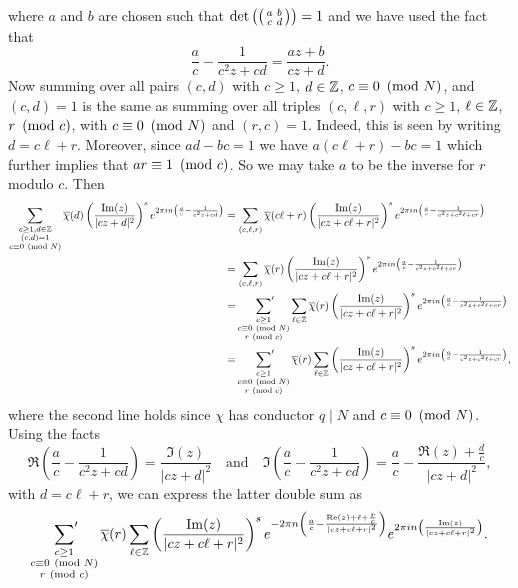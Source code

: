     where $a$ and $b$ are chosen such that $\det\left(\begin{psmallmatrix} a & b \\ c & d \end{psmallmatrix}\right) = 1$ and we have used the fact that
    \[
      \frac{a}{c}-\frac{1}{c^{2}z+cd} = \frac{az+b}{cz+d}.
    \]
    Now summing over all pairs $(c,d)$ with $c \ge 1$, $d \in \mathbb{Z}$, $c \equiv 0 \ \left(\text{mod }N\right)$, and $(c,d) = 1$ is the same as summing over all triples $(c,\ell,r)$ with $c \ge 1$, $\ell \in \mathbb{Z}$, $r \ \left(\text{mod }c\right)$, with $c \equiv 0 \ \left(\text{mod }N\right)$ and $(r,c) = 1$. Indeed, this is seen by writing $d = c\ell+r$. Moreover, since $ad-bc = 1$ we have $a(c\ell+r)-bc = 1$ which further implies that $ar \equiv 1 \ \left(\text{mod }c\right)$. So we may take $a$ to be the inverse for $r$ modulo $c$. Then
    \begin{align*}
      \sum_{\substack{c \ge 1,d \in \mathbb{Z} \\ (c,d) = 1 \\ c \equiv 0 \ \left(\text{mod }N\right)}}\overline{\chi}(d)\left(\frac{\mathrm{Im}(z)}{|cz+d|^{2}}\right)^{s}e^{2\pi in\left(\frac{a}{c}-\frac{1}{c^{2}z+cd}\right)} &= \sum_{(c,\ell,r)}\overline{\chi}(c\ell+r)\left(\frac{\mathrm{Im}(z)}{|cz+c\ell+r|^{2}}\right)^{s}e^{2\pi in\left(\frac{a}{c}-\frac{1}{c^{2}z+c^{2}\ell+cr}\right)} \\
      &= \sum_{(c,\ell,r)}\overline{\chi}(r)\left(\frac{\mathrm{Im}(z)}{|cz+c\ell+r|^{2}}\right)^{s}e^{2\pi in\left(\frac{a}{c}-\frac{1}{c^{2}z+c^{2}\ell+cr}\right)} \\
      &= \sideset{}{'}\sum_{\substack{c \ge 1 \\ c \equiv 0 \ \left(\text{mod }N\right) \\ r \ \left(\text{mod }c\right)}}\sum_{\ell \in \mathbb{Z}}\overline{\chi}(r)\left(\frac{\mathrm{Im}(z)}{|cz+c\ell+r|^{2}}\right)^{s}e^{2\pi in\left(\frac{a}{c}-\frac{1}{c^{2}z+c^{2}\ell+cr}\right)} \\
      &= \sideset{}{'}\sum_{\substack{c \ge 1 \\ c \equiv 0 \ \left(\text{mod }N\right) \\ r \ \left(\text{mod }c\right)}}\overline{\chi}(r)\sum_{\ell \in \mathbb{Z}}\left(\frac{\mathrm{Im}(z)}{|cz+c\ell+r|^{2}}\right)^{s}e^{2\pi in\left(\frac{a}{c}-\frac{1}{c^{2}z+c^{2}\ell+cr}\right)},
    \end{align*}
    where the second line holds since $\chi$ has conductor $q \mid N$ and $c \equiv 0 \ \left(\text{mod }N\right)$. Using the facts
    \[
      \Re\left(\frac{a}{c}-\frac{1}{c^{2}z+cd}\right) = \frac{\Im(z)}{|cz+d|^{2}} \quad \text{and} \quad \Im\left(\frac{a}{c}-\frac{1}{c^{2}z+cd}\right) = \frac{a}{c}-\frac{\Re(z)+\frac{d}{c}}{|cz+d|^{2}},
    \]
    with $d = c\ell+r$, we can express the latter double sum as
    \[
      \sideset{}{'}\sum_{\substack{c \ge 1 \\ c \equiv 0 \ \left(\text{mod }N\right) \\ r \ \left(\text{mod }c\right)}}\overline{\chi}(r)\sum_{\ell \in \mathbb{Z}}\left(\frac{\mathrm{Im}(z)}{|cz+c\ell+r|^{2}}\right)^{s}e^{-2\pi n\left(\frac{a}{c}-\frac{\mathrm{Re}(z)+\ell+\frac{r}{c}}{|cz+c\ell+r|^{2}}\right)}e^{2\pi i n\left(\frac{\mathrm{Im}(z)}{|cz+c\ell+r|^{2}}\right)}.
    \]
